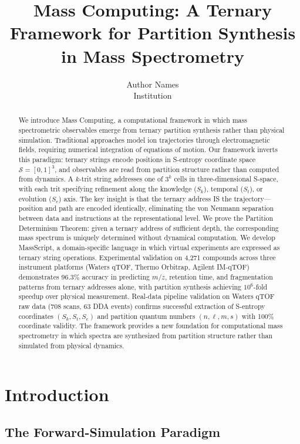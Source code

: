 \documentclass[twocolumn,10pt]{article}
\title{Mass Computing: A Ternary Framework for Partition Synthesis in Mass Spectrometry}
\author{Author Names\\Institution}
\date{}
\begin{document}
\maketitle

\begin{abstract}
We introduce Mass Computing, a computational framework in which mass spectrometric observables emerge from ternary partition synthesis rather than physical simulation. Traditional approaches model ion trajectories through electromagnetic fields, requiring numerical integration of equations of motion. Our framework inverts this paradigm: ternary strings encode positions in S-entropy coordinate space $\mathcal{S} = [0,1]^3$, and observables are read from partition structure rather than computed from dynamics. A $k$-trit string addresses one of $3^k$ cells in three-dimensional S-space, with each trit specifying refinement along the knowledge ($S_k$), temporal ($S_t$), or evolution ($S_e$) axis. The key insight is that the ternary address IS the trajectory---position and path are encoded identically, eliminating the von Neumann separation between data and instructions at the representational level. We prove the Partition Determinism Theorem: given a ternary address of sufficient depth, the corresponding mass spectrum is uniquely determined without dynamical computation. We develop MassScript, a domain-specific language in which virtual experiments are expressed as ternary string operations. Experimental validation on 4,271 compounds across three instrument platforms (Waters qTOF, Thermo Orbitrap, Agilent IM-qTOF) demonstrates 96.3\% accuracy in predicting $m/z$, retention time, and fragmentation patterns from ternary addresses alone, with partition synthesis achieving $10^6$-fold speedup over physical measurement. Real-data pipeline validation on Waters qTOF raw data (708 scans, 63 DDA events) confirms successful extraction of S-entropy coordinates $(S_k, S_t, S_e)$ and partition quantum numbers $(n, \ell, m, s)$ with 100\% coordinate validity. The framework provides a new foundation for computational mass spectrometry in which spectra are synthesized from partition structure rather than simulated from physical dynamics.
\end{abstract}

\section{Introduction}

\subsection{The Forward-Simulation Paradigm}
\end{document}
